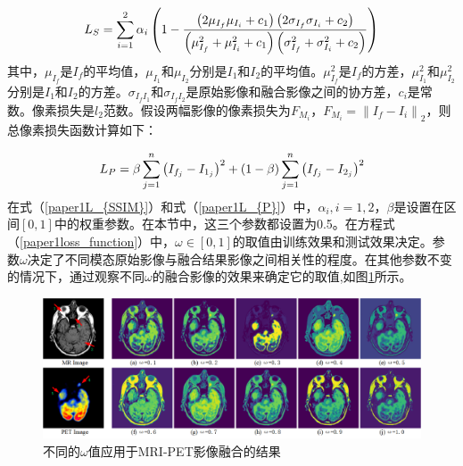      \begin{equation}\label{paper1L_{SSIM}}
        L_{S}=\sum_{i=1}^2\alpha_i\left(1-\frac{\left(2 \mu_{I_f} \mu_{I_{i}}+c_{1}\right)\left(2 \sigma_{I_f}\sigma_{ I_{i}}+c_{2}\right)}{\left(\mu_{I_f}^{2}+\mu_{I_{i}}^{2}+c_{1}\right)\left(\sigma_{I_f}^{2}+\sigma_{I_{i}}^{2}+c_{2}\right)}\right)
      \end{equation}
其中，$\mu_{I_f}$是$I_f$的平均值，$\mu_{I_{1}}$和$\mu_{I_{2}}$分别是$I_{1}$和$I_{2}$的平均值。$\mu_{I_f}^{2}$是$I_f$的方差，$\mu_{I_{1}}^{2}$和$\mu_{I_{2}}^{2}$分别是$I_{1}$和$I_{2}$的方差。$\sigma_{I_f I_{1}}$和$\sigma_{I_f I_{2}}$是原始影像和融合影像之间的协方差，$c_{i}$是常数。像素损失是$l_{2}$范数。假设两幅影像的像素损失为$F_{M_i}$，$F_{M_i}= \left\|I_f-I_i \right\|_2$，则总像素损失函数计算如下：

      \begin{equation}\label{paper1L_{P}}
       L_{P}= \beta \sum_{j=1}^{n}\left(I_{f_{j}}-I_{1_{j}}\right)^{2}+
       (1- \beta)\sum_{j=1}^{n}\left(I_{f_{j}}-I_{2_{j}}\right)^{2}
      \end{equation}
在式（\ref{paper1L_{SSIM}}）和式（\ref{paper1L_{P}}）中，$\alpha_i,i=1,2$，$\beta $是设置在区间$[0,1]$中的权重参数。在本节中，这三个参数都设置为0.5。在方程式（\ref{paper1loss_function}）中，$\omega\in[0,1]$的取值由训练效果和测试效果决定。参数$\omega$决定了不同模态原始影像与融合结果影像之间相关性的程度。在其他参数不变的情况下，通过观察不同$\omega$的融合影像的效果来确定它的取值,如图\ref{difOmega}所示。
   \begin{figure}[htbp]
      \centering
          \includegraphics[width=0.9\columnwidth]{figs/difOmega.png}
          \caption{不同的$\omega$值应用于MRI-PET影像融合的结果 }\label{difOmega}
     \end{figure}
     
